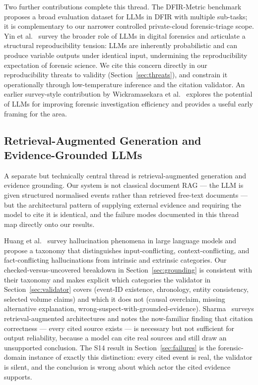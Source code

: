 \documentclass[conference]{IEEEtran}
\begin{document}
Two further contributions complete this thread. The DFIR-Metric benchmark~\cite{ref7} proposes a broad evaluation dataset for LLMs in DFIR with multiple sub-tasks; it is complementary to our narrower controlled private-cloud forensic-triage scope. Yin et al.~\cite{ref8} survey the broader role of LLMs in digital forensics and articulate a structural reproducibility tension: LLMs are inherently probabilistic and can produce variable outputs under identical input, undermining the reproducibility expectation of forensic science. We cite this concern directly in our reproducibility threats to validity (Section~\ref{sec:threats}), and constrain it operationally through low-temperature inference and the citation validator. An earlier survey-style contribution by Wickramasekara et al.~\cite{ref9} explores the potential of LLMs for improving forensic investigation efficiency and provides a useful early framing for the area.

\subsection{Retrieval-Augmented Generation and Evidence-Grounded LLMs}

A separate but technically central thread is retrieval-augmented generation and evidence grounding. Our system is not classical document RAG --- the LLM is given structured normalised events rather than retrieved free-text documents --- but the architectural pattern of supplying external evidence and requiring the model to cite it is identical, and the failure modes documented in this thread map directly onto our results.

Huang et al.~\cite{ref10} survey hallucination phenomena in large language models and propose a taxonomy that distinguishes input-conflicting, context-conflicting, and fact-conflicting hallucinations from intrinsic and extrinsic categories. Our checked-versus-uncovered breakdown in Section~\ref{sec:grounding} is consistent with their taxonomy and makes explicit which categories the validator in Section~\ref{sec:validator} covers (event-ID existence, chronology, entity consistency, selected volume claims) and which it does not (causal overclaim, missing alternative explanation, wrong-suspect-with-grounded-evidence). Sharma~\cite{ref11} surveys retrieval-augmented architectures and notes the now-familiar finding that citation correctness --- every cited source exists --- is necessary but not sufficient for output reliability, because a model can cite real sources and still draw an unsupported conclusion. The S14 result in Section~\ref{sec:failures} is the forensic-domain instance of exactly this distinction: every cited event is real, the validator is silent, and the conclusion is wrong about which actor the cited evidence supports.
\end{document}
